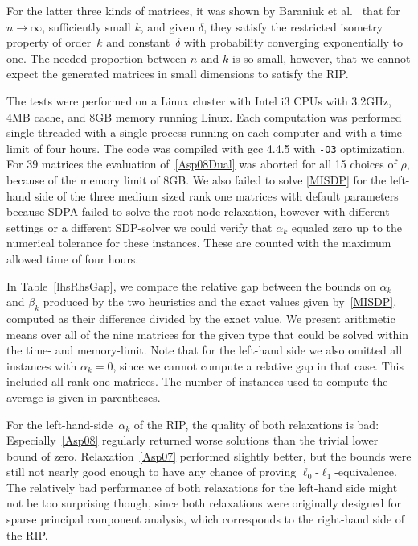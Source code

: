 \documentclass[journal]{IEEEtran}
\begin{document}
For the latter three kinds of matrices, it was shown by Baraniuk et al.~\cite{BDDW08} that for $n \rightarrow \infty$, 
sufficiently small $k$, and given $\delta$, they satisfy the restricted
isometry property of order~$k$ and constant~$\delta$
with probability converging exponentially to one. The needed proportion between $n$ and $k$ is so small, however,
that we cannot expect the generated matrices in small dimensions to satisfy the RIP.

The tests were performed on a Linux cluster with Intel i3 CPUs with 3.2GHz, 4MB cache, and 8GB memory running
Linux. Each computation was performed single-threaded with a single process running on each computer and with 
a time limit of four hours. The code was compiled with gcc 4.4.5 with \texttt{-O3} optimization. For 39 matrices 
the evaluation of~\eqref{Asp08Dual} was aborted for all 15 choices of $\rho$, because of the memory limit of 8GB.
\color{red}We also failed to solve \eqref{MISDP} for the left-hand side of the three medium sized rank one matrices with default
parameters because SDPA failed to solve the root node relaxation, however with different settings or a different
SDP-solver we could verify that $\alpha_k$ equaled zero up to the numerical tolerance for these instances.\color{black}
These are counted with the maximum allowed time of four hours. 

In Table~\ref{lhsRhsGap}, we compare the relative gap between the bounds on $\alpha_k$ and $\beta_k$ produced by the two heuristics
and the exact values given by~\eqref{MISDP}, computed as their difference divided by the exact value. We present arithmetic means over all of the nine matrices for the given type that
could be solved within the time- and memory-limit. Note that for the left-hand side we also omitted all instances with $\alpha_k=0$, 
since we cannot compute a relative gap in that case. This included all rank one matrices. The number of instances used to compute the
average is given in parentheses.

For the left-hand-side~$\alpha_k$ of the RIP, the quality of both
relaxations is bad: Especially~\eqref{Asp08} regularly returned worse solutions than the
trivial lower bound of zero. Relaxation~\eqref{Asp07} performed slightly better, but the bounds
were still not nearly good enough to have any chance of proving $\ell_0$-$\ell_1$-equivalence. The relatively
bad performance of both relaxations for the left-hand side might not be too surprising though, since both relaxations
were originally designed for sparse principal component analysis, which corresponds to the right-hand side
of the RIP.
\end{document}
